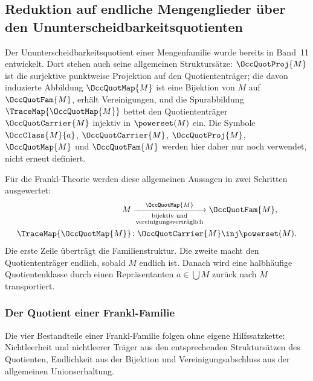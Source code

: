 \documentclass[main.tex]{subfiles}
\begin{document}
\subsection{Reduktion auf endliche Mengenglieder über den
Ununterscheidbarkeitsquotienten}

Der Ununterscheidbarkeitsquotient einer Mengenfamilie wurde bereits in
Band~11 entwickelt. Dort stehen auch seine allgemeinen Struktursätze:
\(\OccQuotProj{M}\) ist die surjektive punktweise Projektion auf den
Quotiententräger; die davon induzierte Abbildung
\(\OccQuotMap{M}\) ist eine Bijektion von \(M\) auf
\(\OccQuotFam{M}\), erhält Vereinigungen, und die Spurabbildung
\(\TraceMap{\OccQuotMap{M}}\) bettet den Quotiententräger
\(\OccQuotCarrier{M}\) injektiv in \(\powerset(M)\) ein. Die Symbole
\(\OccClass{M}{a}\), \(\OccQuotCarrier{M}\), \(\OccQuotProj{M}\),
\(\OccQuotMap{M}\) und \(\OccQuotFam{M}\) werden hier daher nur noch
verwendet, nicht erneut definiert.

Für die Frankl-Theorie werden diese allgemeinen Aussagen in zwei Schritten
ausgewertet:
\[
\begin{aligned}
M
&\xrightarrow[\substack{\text{bijektiv und}\\
  \text{vereinigungsverträglich}}]{\ \OccQuotMap{M}\ }
  \OccQuotFam{M},
\\
\TraceMap{\OccQuotMap{M}}
&\colon \OccQuotCarrier{M}\inj\powerset(M).
\end{aligned}
\]
Die erste Zeile überträgt die Familienstruktur. Die zweite macht den
Quotiententräger endlich, sobald \(M\) endlich ist. Danach wird eine
halbhäufige Quotientenklasse durch einen Repräsentanten
\(a\in\bigcup M\) zurück nach \(M\) transportiert.

\subsubsection{Der Quotient einer Frankl-Familie}

Die vier Bestandteile einer Frankl-Familie folgen ohne eigene Hilfssatzkette:
Nichtleerheit und nichtleerer Träger aus den entsprechenden
Struktursätzen des Quotienten, Endlichkeit aus der Bijektion und
Vereinigungsabschluss aus der allgemeinen Unionserhaltung.
\end{document}
